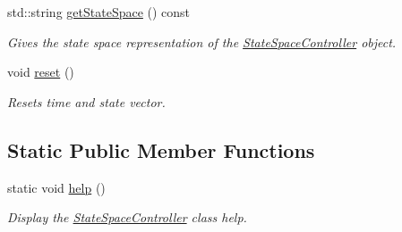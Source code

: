 \begin{DoxyCompactItemize}
std\+::string \hyperlink{classStateSpaceController_a40a127a65a4ac83f8390ce28cd246d28}{get\+State\+Space} () const
\begin{DoxyCompactList}\small\item\em Gives the state space representation of the \hyperlink{classStateSpaceController}{State\+Space\+Controller} object. \end{DoxyCompactList}\item 
\mbox{\label{classStateSpaceController_a188c3a29e1f2a0dfe25eb3724e402f92}} 
void \hyperlink{classStateSpaceController_a188c3a29e1f2a0dfe25eb3724e402f92}{reset} ()
\begin{DoxyCompactList}\small\item\em Resets time and state vector. \end{DoxyCompactList}\end{DoxyCompactItemize}
\subsection*{Static Public Member Functions}
\begin{DoxyCompactItemize}
\item 
\mbox{\label{classStateSpaceController_a5074256f03f8a541cc74bb28a247244b}} 
static void \hyperlink{classStateSpaceController_a5074256f03f8a541cc74bb28a247244b}{help} ()
\begin{DoxyCompactList}\small\item\em Display the \hyperlink{classStateSpaceController}{State\+Space\+Controller} class help. \end{DoxyCompactList}\end{DoxyCompactItemize}
